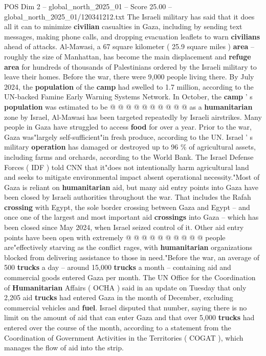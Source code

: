 \begin{textsample}{POS Dim 2 – global\_north\_2025\_01 – Score 25.00 – global\_north\_2025\_01/120341212.txt}
The Israeli military has said that it does all it can to minimize \textbf{civilian} casualties in Gaza, including by sending text messages, making phone calls, and dropping evacuation leaflets to warn \textbf{civilians} ahead of attacks.
Al-Mawasi, a 67 square kilometer ( 25.9 square miles ) \textbf{area} -- roughly the size of Manhattan, has become the main displacement and \textbf{refuge} \textbf{area} for hundreds of thousands of Palestinians ordered by the Israeli military to leave their homes.
Before the war, there were 9,000 people living there.
By July 2024, the \textbf{population} of the \textbf{camp} had swelled to 1.7 million, according to the UN-backed Famine Early Warning Systems Network.
In October, the \textbf{camp} ' s \textbf{population} was estimated to be @ @ @ @ @ @ @ @ @ @ as a \textbf{humanitarian} zone by Israel, Al-Mawasi has been targeted repeatedly by Israeli airstrikes.
Many people in Gaza have struggled to access \textbf{food} for over a year.
Prior to the war, Gaza was"largely self-sufficient"in fresh produce, according to the UN.
Israel ' s military \textbf{operation} has damaged or destroyed up to 96 \% of agricultural assets, including farms and orchards, according to the World Bank.
The Israel Defense Forces ( IDF ) told CNN that it"does not intentionally harm agricultural land and seeks to mitigate environmental impact absent operational necessity."Most of Gaza is reliant on \textbf{humanitarian} aid, but many aid entry points into Gaza have been closed by Israeli authorities throughout the war.
That includes the Rafah \textbf{crossing} with Egypt, the sole border crossing between Gaza and Egypt -- and once one of the largest and most important aid \textbf{crossings} into Gaza -- which has been closed since May 2024, when Israel seized control of it.
Other aid entry points have been open with extremely @ @ @ @ @ @ @ @ @ @ people are"effectively starving as the conflict rages, with \textbf{humanitarian} organizations blocked from delivering assistance to those in need."Before the war, an average of 500 \textbf{trucks} a day -- around 15,000 \textbf{trucks} a month -- containing aid and commercial goods entered Gaza per month.
The UN Office for the Coordination of \textbf{Humanitarian} Affairs ( OCHA ) said in an update on Tuesday that only 2,205 aid \textbf{trucks} had entered Gaza in the month of December, excluding commercial vehicles and \textbf{fuel}.
Israel disputed that number, saying there is no limit on the amount of aid that can enter Gaza and that over 5,000 \textbf{trucks} had entered over the course of the month, according to a statement from the Coordination of Government Activities in the Territories ( COGAT ), which manages the flow of aid into the strip.

\end{textsample}
